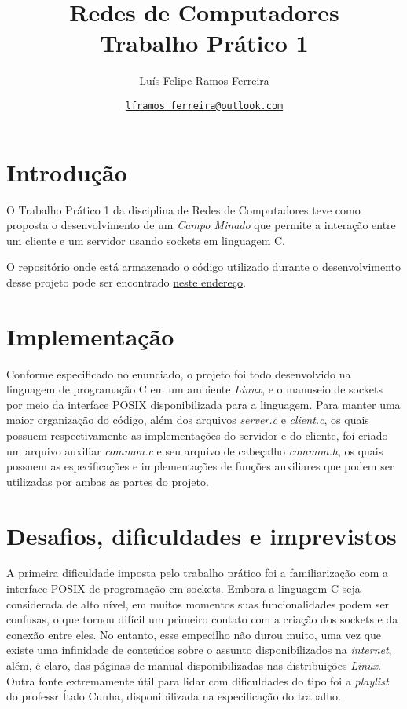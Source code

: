 \documentclass{article}
\title{Redes de Computadores \\ \large Trabalho Prático 1}
\author{Luís Felipe Ramos Ferreira}
\date{\href{mailto:lframos\_ferreira@outlook.com}{\texttt{lframos\_ferreira@outlook.com}}
}
\begin{document}
\maketitle

\section{Introdução}

O Trabalho Prático 1 da disciplina de Redes de Computadores teve como proposta
o desenvolvimento de um \textit{Campo Minado} que permite a interação entre um
cliente e um servidor usando sockets em linguagem C.

O repositório onde está armazenado o código utilizado durante o desenvolvimento desse projeto
pode ser encontrado \href{https://github.com/lframosferreira/tp1-redes}{neste endereço}.

\section{Implementação}

Conforme especificado no enunciado, o projeto foi todo desenvolvido na
linguagem de programação C em um ambiente \textit{Linux}, e o manuseio de sockets por
meio da interface POSIX
disponibilizada para a linguagem. Para manter uma maior organização do código,
além dos arquivos \textit{server.c} e \textit{client.c}, os quais possuem
respectivamente as implementações do servidor e do cliente,
foi criado um arquivo auxiliar \textit{common.c} e seu arquivo de cabeçalho
\textit{common.h}, os quais possuem as especificações e implementações de
funções auxiliares que podem ser utilizadas por ambas as partes do projeto.

\section{Desafios, dificuldades e imprevistos}

A primeira dificuldade imposta pelo trabalho prático foi a familiarização com a
interface POSIX de programação em sockets. Embora a linguagem C seja
considerada de alto nível, em muitos momentos suas funcionalidades podem ser
confusas, o que tornou difícil um primeiro contato com a criação dos sockets e
da conexão entre eles. No entanto, esse empecilho não durou muito, uma vez que
existe uma infinidade de conteúdos sobre o assunto disponibilizados na
\textit{internet}, além, é
claro, das páginas de manual disponibilizadas nas distribuições \textit{Linux}.
Outra fonte extremamente útil para lidar com dificuldades do tipo foi a
\textit{playlist} do professr Ítalo Cunha, disponibilizada na especificação do
trabalho.
\end{document}
